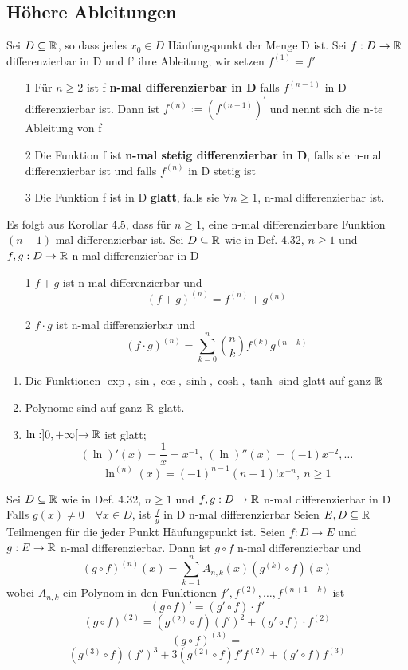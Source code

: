 \subsection{Höhere Ableitungen}
\Def[4.32] Sei \(D \subseteq \mathbb{R} \), so dass jedes \(x_0 \in D \) Häufungspunkt der Menge D ist. Sei \(f : D \rightarrow \mathbb{R} \) differenzierbar in D und f' ihre Ableitung; wir setzen \(f^{(1)} = f'\)
\begin{enumerate}
    \item [1] Für \(n \geq 2\) ist f \textbf{n-mal differenzierbar in D} falls \(f^{(n-1)}\) in D differenzierbar ist. Dann ist \( f^{(n)} := (f^{(n-1)})^{'}\) und nennt sich die n-te Ableitung von f
    \item [2] Die Funktion f ist \textbf{n-mal stetig differenzierbar in D}, falls sie n-mal differenzierbar ist und falls \( f^{(n)}\) in D stetig ist
    \item [3] Die Funktion f ist in D \textbf{glatt}, falls sie \( \forall n \geq 1\), n-mal differenzierbar ist. 
\end{enumerate}
 Es folgt aus Korollar 4.5, dass für \(n \geq 1\), eine n-mal differenzierbare Funktion \newline \((n-1)\)-mal differenzierbar ist. \newline
\Satz[4.34] Sei \( D \subseteq \mathbb{R} \) wie in Def. 4.32, \(n \geq 1\) und \( f,g : D \rightarrow \mathbb{R} \) n-mal differenzierbar in D
\begin{enumerate}
    \item [1] \(f+g\) ist n-mal differenzierbar und
    \[(f+g)^{(n)} = f^{(n)} + g^{(n)}\]
    \item [2] \(f \cdot g\) ist n-mal differenzierbar und
    \[(f \cdot g)^{(n)} = \sum_{k=0}^{n} \binom{n}{k} f^{(k)}g^{(n-k)}\]
\end{enumerate}
\Bsp[4.35]
\begin{enumerate}
    \item Die Funktionen \(\exp, \sin, \cos, \sinh, \cosh, \tanh \) sind glatt auf ganz \( \mathbb{R}\)
    \item Polynome sind auf ganz \( \mathbb{R} \) glatt.
    \item \( \ln : ]0,+\infty [ \rightarrow \mathbb{R} \) ist glatt;
    \[ (\ln)'(x) = \frac{1}{x} = x^{-1}, \ (\ln)''(x) = (-1)x^{-2}, \dots\]
    \[\ln^{(n)}(x) = (-1)^{n-1}(n-1)!x^{-n}, \  n \geq 1\]
\end{enumerate}
\Satz[4.36] Sei \( D \subseteq \mathbb{R} \) wie in Def. 4.32, \( n \geq 1 \) und \(f, g: D \rightarrow \mathbb{R}\) n-mal differenzierbar in D
Falls \(g(x) \neq 0 \quad \forall x \in D\), ist \(\frac{f}{g}\) in D n-mal differenzierbar
\Satz[4.37] Seien \(E,D \subseteq \mathbb{R} \) Teilmengen für die jeder Punkt Häufungspunkt ist. Seien \(f:D \rightarrow E\) und \(g: E \rightarrow \mathbb{R} \) n-mal differenzierbar. Dann ist \( g \circ f\) n-mal differenzierbar und
\[(g \circ f)^{(n)}(x) = \sum_{k=1}^n A_{n,k}(x) (g^{(k)} \circ f) (x)\]
wobei \( A_{n,k}\) ein Polynom in den Funktionen \( f', f^{(2)}, \dots , f^{(n+1-k)}\) ist
\[( g \circ f)' = (g' \circ f) \cdot f'\]
\[(g \circ f)^{(2)} = ( g^{(2)} \circ f)(f')^2 + ( g' \circ f) \cdot f^{(2)}\]
\[(g \circ f)^{(3)} = \]
\[(g^{(3)} \circ f) (f')^3 + 3(g^{(2)} \circ f)f'f^{(2)} + (g' \circ f) f^{(3)}\]

